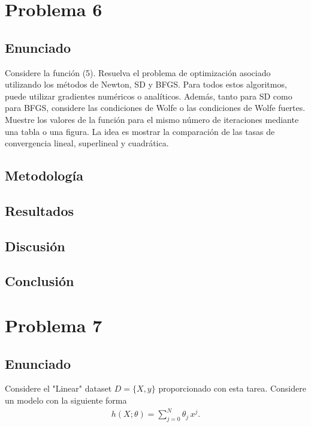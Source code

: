 \documentclass{article}
\begin{document}
\section{Problema 6}

\subsection{Enunciado}

Considere la función (5). Resuelva el problema de optimización asociado utilizando los métodos de Newton, SD y BFGS. Para todos estos algoritmos, puede utilizar gradientes numéricos o analíticos. Además, tanto para SD como para BFGS, considere las condiciones de Wolfe o las condiciones de Wolfe fuertes. Muestre los valores de la función para el mismo número de iteraciones mediante una tabla o una figura. La idea es mostrar la comparación de las tasas de convergencia lineal, superlineal y cuadrática.

\subsection{Metodología}

\subsection{Resultados}
\setcounter{equation}{0}

\subsection{Discusión}

\subsection{Conclusión}

\section{Problema 7}

\subsection{Enunciado}

Considere el "Linear" dataset $D=\{X, y\}$ proporcionado con esta tarea. Considere un modelo con la siguiente forma
\begin{align} \tag{7}
h(X;\theta) = \sum_{j=0}^{N} \theta_j\, x^j.
\end{align}
\end{document}
